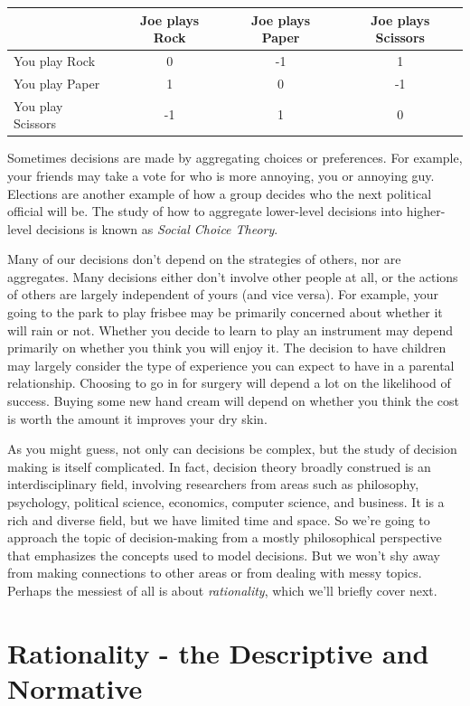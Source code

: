 \documentclass[]{tufte-book}
\begin{document}
\begin{longtable}[]{@{}lccc@{}}
\toprule
& Joe plays Rock & Joe plays Paper & Joe plays Scissors\tabularnewline
\midrule
\endhead
You play Rock & 0 & -1 & 1\tabularnewline
You play Paper & 1 & 0 & -1\tabularnewline
You play Scissors & -1 & 1 & 0\tabularnewline
\bottomrule
\end{longtable}

Sometimes decisions are made by aggregating choices or preferences. For example, your friends may take a vote for who is more annoying, you or annoying guy. Elections are another example of how a group decides who the next political official will be. The study of how to aggregate lower-level decisions into higher-level decisions is known as \emph{Social Choice Theory}.

Many of our decisions don't depend on the strategies of others, nor are aggregates. Many decisions either don't involve other people at all, or the actions of others are largely independent of yours (and vice versa). For example, your going to the park to play frisbee may be primarily concerned about whether it will rain or not. Whether you decide to learn to play an instrument may depend primarily on whether you think you will enjoy it. The decision to have children may largely consider the type of experience you can expect to have in a parental relationship. Choosing to go in for surgery will depend a lot on the likelihood of success. Buying some new hand cream will depend on whether you think the cost is worth the amount it improves your dry skin.

As you might guess, not only can decisions be complex, but the study of decision making is itself complicated. In fact, decision theory broadly construed is an interdisciplinary field, involving researchers from areas such as philosophy, psychology, political science, economics, computer science, and business. It is a rich and diverse field, but we have limited time and space. So we're going to approach the topic of decision-making from a mostly philosophical perspective that emphasizes the concepts used to model decisions. But we won't shy away from making connections to other areas or from dealing with messy topics. Perhaps the messiest of all is about \emph{rationality}, which we'll briefly cover next.

\hypertarget{rationality---the-descriptive-and-normative}{%
\section{Rationality - the Descriptive and Normative}\label{rationality---the-descriptive-and-normative}}
\end{document}
